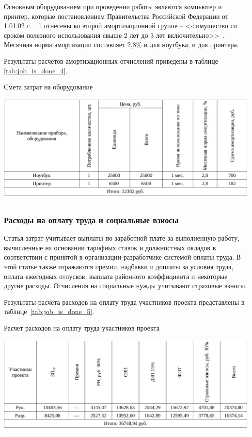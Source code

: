 Основным оборудованием при проведении работы являются компьютер и принтер, которые 
постановлением Правительства Российской Федерации от 1.01.02 г.~\textnumero~1 отнесены ко второй амортизационной группе – 
<<имущество со сроком полезного использования свыше 2 лет до 3 лет включительно>>~\cite{amort}. 
Месячная норма амортизации составляет 2,8\% и для ноутбука, и для принтера.

Результаты расчётов амортизационных отчислений приведены в таблице \ref{tab:job_is_done_4}.

\begin{table}[!ht]
\caption{Смета затрат на оборудование}
\centering
\includegraphics[page=1, width=1\linewidth]{tables/economics/schedule_4.pdf}
\label{tab:job_is_done_4}
\end{table}

\subsubsection{Расходы на оплату труда и социальные взносы}

Статья затрат учитывает выплаты по заработной плате за выполненную работу, 
вычисленные на основании тарифных ставок и должностных окладов в соответствии с принятой в 
организации-разработчике системой оплаты труда. В этой статье также отражаются премии, надбавки и доплаты за 
условия труда, оплата ежегодных отпусков, выплата районного коэффициента и некоторые другие расходы. 
Отчисления на социальные нужды учитывают страховые взносы.

Результаты расчёта расходов на оплату труда участников проекта представлены в таблице~\ref{tab:job_is_done_5}.

\begin{table}[!ht]
\caption{Расчет расходов на оплату труда участников проекта}
\centering
\includegraphics[page=1, width=1\linewidth]{tables/economics/schedule_5.pdf}
\label{tab:job_is_done_5}
\end{table}


